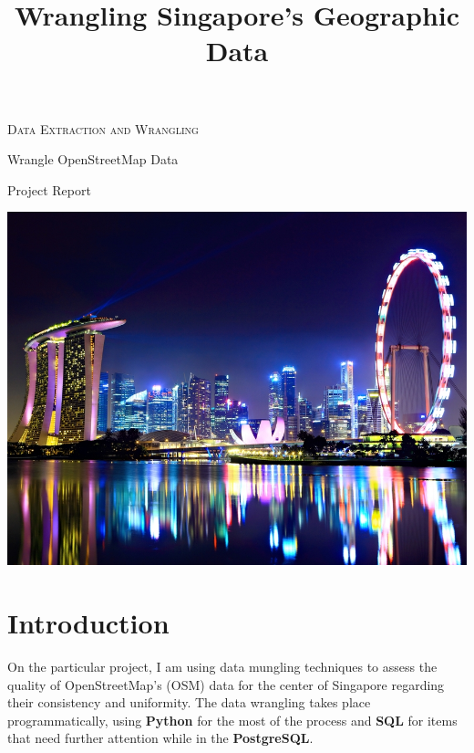 \documentclass[11pt]{article}
\title{Wrangling Singapore’s Geographic Data}
\begin{document}
    \begin{flushleft}
{\Large\scshape Data Extraction and Wrangling}\par
\end{flushleft}
\begin{flushleft}
{\huge Wrangle OpenStreetMap Data}\par

{\Large\ttfamily Project Report}\par
    \end{flushleft}

        
    
    \includegraphics[width=\textwidth]{singapore.jpg}

    
    \section*{Introduction}\label{Introduction}

   

    On the particular project, I am using data mungling techniques to assess
the quality of OpenStreetMap's (OSM) data for the center of Singapore
regarding their consistency and uniformity. The data wrangling takes
place programmatically, using \textbf{Python} for the most of the
process and \textbf{SQL} for items that need further attention while in
the \textbf{PostgreSQL}.\\
\end{document}
